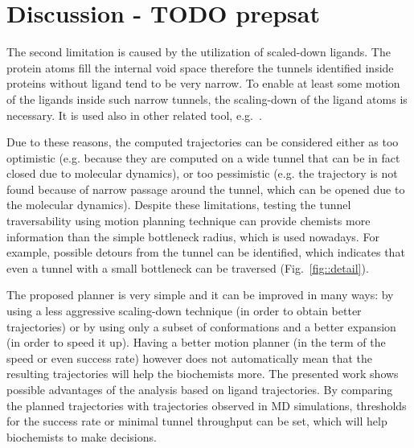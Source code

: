 \documentclass[usletter, 10pt, conference]{ieeeconf} %
\begin{document}
\section{Discussion - TODO prepsat}




The second limitation is caused by the utilization of scaled-down ligands.
The protein atoms fill the internal void space therefore the tunnels identified inside proteins without ligand tend
to be very narrow.
To enable at least some motion of the ligands inside such narrow tunnels, the scaling-down of the ligand atoms is necessary.
It is used also in other related tool, e.g.~\cite{cortes2005path}.

Due to these reasons, the computed trajectories can be considered either as too optimistic
(e.g. because they are computed on a wide tunnel that can be in fact closed due to molecular dynamics),
or too pessimistic (e.g. the trajectory is not found because of narrow passage around the tunnel, which can be 
opened due to the molecular dynamics).
Despite these limitations, testing the tunnel traversability using motion planning technique can provide chemists more information
than the simple bottleneck radius, which is used nowadays.
For example, possible detours from the tunnel can be identified, which indicates that even a tunnel with a small
bottleneck can be traversed (Fig.~\ref{fig::detail}).


The proposed planner is very simple and it can be improved in many ways: by using a less aggressive scaling-down technique (in order
to obtain better trajectories) or by using only a subset of conformations and a better expansion (in order to speed it up).
Having a better motion planner (in the term of the speed or even success rate) however does not automatically mean that the resulting trajectories will help the biochemists more.
The presented work shows possible advantages of the analysis based on ligand trajectories.
By comparing the planned trajectories with trajectories observed in MD simulations, thresholds for the success rate or minimal tunnel throughput can be set, which will help biochemists to make decisions.
\end{document}
